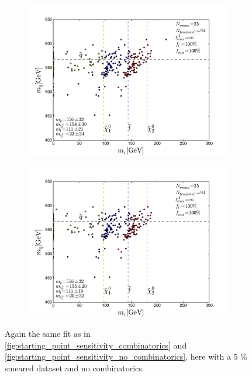 \documentclass[twoside,english]{uiofysmaster}
\begin{document}
\begin{figure}[hbt]
	\begin{subfigure}[b]{0.45\textwidth}
		\includegraphics[width=\textwidth]{figures/improving_combinatorics/herwigpp_5psmear_lowtol_nocomb_800-500-300-50.pdf} 
		\caption{ }
	\end{subfigure}
	\begin{subfigure}[b]{0.45\textwidth}
		\includegraphics[width=\textwidth]{figures/improving_combinatorics/herwigpp_5psmear_lowtol_nocomb_1000-100-80-30.pdf}
		\caption{ } 
	\end{subfigure}
	\caption{Again the same fit as in \ref{fig:starting_point_sensitivity_combinatorics} and \ref{fig:starting_point_sensitivity_no_combinatorics}, here with a 5 \% smeared dataset and no combinatorics.}
	\label{fig:moving_on-starting_point_sensitivity_no_combinatorics_5pmomsmear}
\end{figure} 
\end{document}
